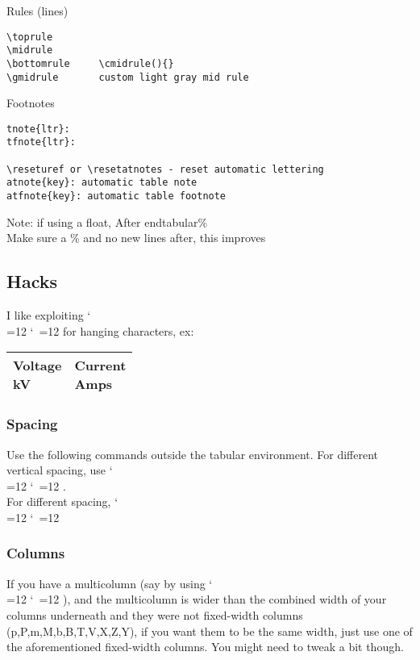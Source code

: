 \documentclass{\FormatDir corpboreportMulti}
\def\cmd{\bgroup\catcode`\\=12 \catcode`\ =12 \cmdA}
\def\cmdA#1{\egroup{\texttt{\detokenize{#1}}}}
\begin{document}
Rules (lines)
\begin{lstlisting}
\toprule
\midrule
\bottomrule		\cmidrule(){}
\gmidrule		custom light gray mid rule
\end{lstlisting}

Footnotes
\begin{lstlisting}
tnote{ltr}:
tfnote{ltr}:

\reseturef or \resetatnotes - reset automatic lettering
atnote{key}: automatic table note
atfnote{key}: automatic table footnote
\end{lstlisting}


Note: if using a float,
After end{tabular}\%\\
Make sure a \% and no new lines after, this improves

\subsection{Hacks}


I like exploiting \cmd{\rlap} for hanging characters, ex:

\begin{LTXexample}
\begin{tabular}{ll}\toprule
\MC{Voltage\rlap{,}\\kV} & \MC{Current\rlap{,}\\Amps} \\\bottomrule
\end{tabular}
\end{LTXexample}



\subsubsection{Spacing}
Use the following commands outside the tabular environment.
For different vertical spacing, use \cmd{\renewcommand{\arraystretch}{1.2}}.\\
For different spacing, \cmd{\setlength\tabcolsep{2ex}}

\subsubsection{Columns}

If you have a multicolumn (say by using \cmd{\MC}), and the multicolumn is wider than the combined width of your
columns underneath and they were not fixed-width columns (p,P,m,M,b,B,T,V,X,Z,Y), if you want them to be the same width,
just use one of the aforementioned fixed-width columns. You might need to tweak a bit though.
\end{document}

